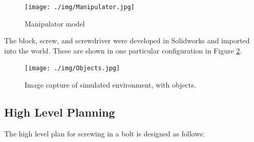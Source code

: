 \documentclass[10pt, conference]{IEEEtran}
\begin{document}
   \begin{figure}[htb]
   \centering
   \texttt{[image: ./img/Manipulator.jpg]}
   \caption{\label{fig:manipulator}Manipulator model}
   \end{figure}

   The block, screw, and screwdriver were developed in Solidworks and
   imported into the world. These are shown in one particular
   configuration in Figure \ref{fig:objects}.

   \begin{figure}[htb]
   \centering
   \texttt{[image: ./img/Objects.jpg]}
   \caption{\label{fig:objects}Image capture of simulated environment, with objects.}
   \end{figure}
\subsection{High Level Planning}
\label{sec-3-3}

   The high level plan for screwing in a bolt is designed as follows:
\end{document}
